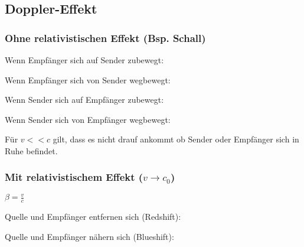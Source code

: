 \subsection{Doppler-Effekt}
    \subsubsection{Ohne relativistischen Effekt (Bsp. Schall)}
    Wenn Empfänger sich auf Sender zubewegt:

    Wenn Empfänger sich von Sender wegbewegt:

    Wenn Sender sich auf Empfänger zubewegt:

    Wenn Sender sich von Empfänger wegbewegt:

    Für $v << c$ gilt, dass es nicht drauf ankommt ob Sender oder Empfänger sich in Ruhe befindet.

    \subsubsection{Mit relativistischem Effekt ($v \rightarrow c_0$)}
    $\beta = \frac{v}{c}$

    Quelle und Empfänger entfernen sich (Redshift):

    Quelle und Empfänger nähern sich (Blueshift):
